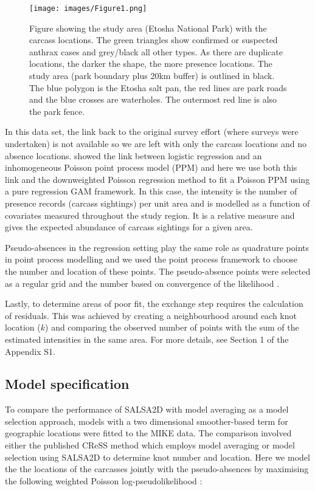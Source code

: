 \documentclass[letterpaper, 12pt]{interact}
\begin{document}
	
	\begin{figure}[!htb]
		\centering
		\texttt{[image: images/Figure1.png]}
		\caption{Figure showing the study area (Etosha National Park) with the carcass locations. The  green triangles show confirmed or suspected anthrax cases and grey/black all other types. As there are duplicate locations, the darker the shape, the more presence locations. The study area (park boundary plus 20km buffer) is outlined in black. The blue polygon is the Etosha salt pan, the red lines are park roads and the blue crosses are waterholes. The outermost red line is also the park fence.}
		\label{fig:raw}
	\end{figure}
	
	
	In this data set, the link back to the original survey effort (where surveys were undertaken) is not available so we are left with only the carcass locations and no absence locations. \citet{warton2010} showed the link between logistic regression and an inhomogeneous Poisson point process model (PPM) and here we use both this link and the downweighted Poisson regression method \cite{renner2013} to fit a Poisson PPM using a pure regression GAM framework. In this case, the intensity is the number of presence records (carcass sightings) per unit area and is modelled as a function of covariates measured throughout the study region. It is a relative measure and gives the expected abundance of carcass sightings for a given area. 
	
	Pseudo-absences in the regression setting play the same role as quadrature points in point process modelling and we used the point process framework to choose the number and location of these points.  The pseudo-absence points were selected as a regular grid and the number based on convergence of the likelihood \cite{renner2013}.
	
	Lastly, to determine areas of poor fit, the exchange step requires the calculation of residuals.  This was achieved by creating a neighbourhood around each knot location ($k$) and comparing the observed number of points with the sum of the estimated intensities in the same area. For more details, see Section 1 of the Appendix S1. 
	
	
	\subsection*{Model specification}\label{model-specification}
	
	To compare the performance of SALSA2D with model averaging as a model selection approach, models with a two dimensional smoother-based term for geographic locations were fitted to the MIKE data. The comparison involved either the published CReSS method which employs model averaging \cite{scott2014} or model selection using SALSA2D to determine knot number and location. Here we model the the locations of the carcasses jointly with the pseudo-absences by maximising the following weighted Poisson log-pseudolikelihood \cite{Berman1992}:
	
\end{document}
